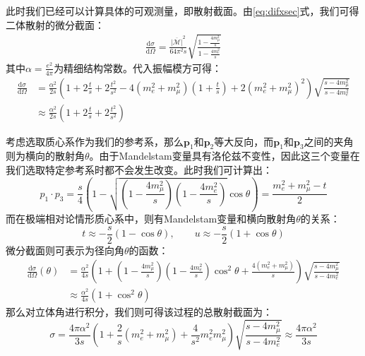 此时我们已经可以计算具体的可观测量，即散射截面。由\eqref{eq:difxsec}式，我们可得二体散射的微分截面：
\begin{equation}
\begin{split}
\frac{\mathrm{d}\sigma}{\mathrm{d}\Omega}=\frac{\overline{|\mathcal{M}|}^2}{64\pi^2 s}\sqrt{\frac{1-\frac{4m_\mu^2}{s}}{1-\frac{4m_e^2}{s}}}
\end{split}
\end{equation}
其中$\alpha=\frac{e^2}{4\pi}$为精细结构常数。代入振幅模方可得：
\begin{equation}
\begin{split}
\frac{\mathrm{d}\sigma}{\mathrm{d}\Omega}&=\frac{\alpha^2}{2s}\left(1+2\frac{t}{s}+2\frac{t^2}{s^2}-4(m_e^2+m_\mu^2)(1+\frac{t}{s})+2(m_e^2+m_\mu^2)^2\right)\sqrt{\frac{s-{4m_\mu^2}}{s-{4m_e^2}}}\\&\approx\frac{\alpha^2}{2s}\left(1+2\frac{t}{s}+2\frac{t^2}{s^2}\right)
\end{split}
\end{equation}

考虑选取质心系作为我们的参考系，那么$\boldsymbol{p}_1$和$\boldsymbol{p}_2$等大反向，而$\boldsymbol{p}_1$和$\boldsymbol{p}_3$之间的夹角则为横向的散射角$\theta$。由于Mandelstam变量具有洛伦兹不变性，因此这三个变量在我们选取特定参考系时都不会发生改变。此时我们可计算出：
\begin{equation}
p_1\cdot p_3=\frac{s}{4}\left(1-\sqrt{(1-\frac{4m_\mu^2}{s})(1-\frac{4m_e^2}{s})}\cos\theta\right)=\frac{m_e^2+m_\mu^2-t}{2}
\end{equation}
而在极端相对论情形质心系中，则有Mandelstam变量和横向散射角$\theta$的关系：
\begin{equation}
t\approx-\frac{s}{2}(1-\cos\theta),\qquad u\approx-\frac{s}{2}(1+\cos\theta)
\end{equation}
微分截面则可表示为径向角$\theta$的函数：
\begin{equation}
\begin{split}
\frac{\mathrm{d}\sigma}{\mathrm{d}\Omega}(\theta)&=\frac{\alpha^2}{4s}\left(1+(1-\frac{4m_\mu^2}{s})(1-\frac{4m_e^2}{s})\cos^2\theta+\frac{4(m_e^2+m_\mu^2)}{s}\right)\sqrt{\frac{s-4m_\mu^2}{s-4m_e^2}}\\
&\approx\frac{\alpha^2}{4s}(1+\cos^2\theta)
\end{split}
\end{equation}
那么对立体角进行积分，我们则可得该过程的总散射截面为：
\begin{equation}
\sigma=\frac{4\pi\alpha^2}{3s}\left(1+\frac{2}{s}(m_e^2+m_\mu^2)+\frac{4}{s^2}m_e^2 m_\mu^2\right)\sqrt{\frac{s-4m_\mu^2}{s-4m_e^2}}\approx\frac{4\pi\alpha^2}{3 s}
\end{equation}

